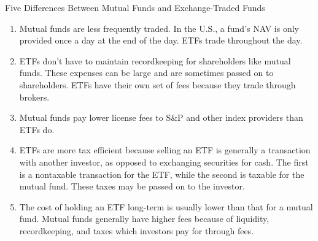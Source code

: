 \documentclass[../custom]{flashcards}
\begin{document}
\begin{flashcard}[\studyArea]{Five Differences Between Mutual Funds and Exchange-Traded Funds}
    \begin{enumerate}
        \item Mutual funds are less frequently traded. In the U.S., a fund's NAV is only provided once a day at the end of the day. ETFs trade throughout the day.
        \item ETFs don't have to maintain recordkeeping for shareholders like mutual funds. These expenses can be large and are sometimes passed on to shareholders. ETFs have their own set of fees because they trade through brokers.
        \item Mutual funds pay lower license fees to S\&P and other index providers than ETFs do.
        \item ETFs are more tax efficient because selling an ETF is generally a transaction with another investor, as opposed to exchanging securities for cash. The first is a nontaxable transaction for the ETF, while the second is taxable for the mutual fund. These taxes may be passed on to the investor.
        \item The cost of holding an ETF long-term is usually lower than that for a mutual fund. Mutual funds generally have higher fees because of liquidity, recordkeeping, and taxes which investors pay for through fees.
    \end{enumerate}
\end{flashcard}

\renewcommand{\studyArea}{Alternative Investments}
\end{document}
